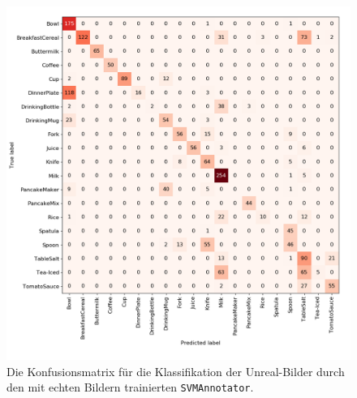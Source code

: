 \begin{figure}
	\includegraphics[scale=.4]{img/chapter6/SVMClassifierGTClass.png}
\caption[Konfusionsmatrix der Klassifizierung durch den SVMAnnotators]{Die Konfusionsmatrix für die Klassifikation der Unreal-Bilder durch den mit echten Bildern trainierten \texttt{SVMAnnotator}.}
\label{fig:SVMClassifierGTClass_confMatrix}
\end{figure}

